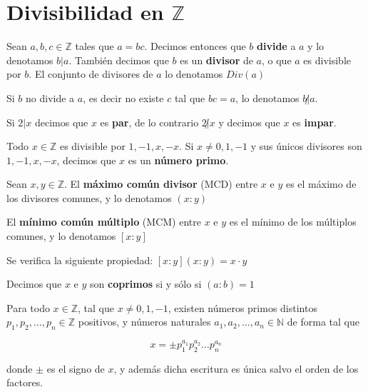 \section{Divisibilidad en $\mathbb{Z}$}

\begin{definition}[Divisibilidad] 
Sean $a,b,c \in \mathbb{Z}$ tales que $a = bc$.  Decimos entonces que $b$ \textbf{divide} a $a$ y lo denotamos $b | a$.  También decimos que $b$ es un \textbf{divisor} de $a$, o que $a$ es divisible por $b$.  El conjunto de divisores de $a$ lo denotamos $Div(a)$

Si $b$ no divide a $a$, es decir no existe $c$ tal que $bc = a$, lo denotamos $b \not| a$.

Si $2|x$ decimos que $x$ es \textbf{par}, de lo contrario $2 \not| x$ y decimos que $x$ es \textbf{impar}.
\end{definition}

\begin{definition} 
Todo $x \in \mathbb{Z}$ es divisible por $1,-1,x,-x$.  Si $x \neq 0,1,-1$ y sus únicos divisores son $1,-1,x,-x$, decimos que $x$ es un \textbf{número primo}.
\end{definition}

\begin{definition} 
Sean $x,y \in \mathbb{Z}$.  El \textbf{máximo común divisor} (MCD) entre $x$ e $y$ es el máximo de los divisores comunes, y lo denotamos $(x:y)$

El \textbf{mínimo común múltiplo} (MCM) entre $x$ e $y$ es el mínimo de los múltiplos comunes, y lo denotamos $[x:y]$

Se verifica la siguiente propiedad: $[x:y] (x:y) = x \cdot y$

Decimos que $x$ e $y$ son \textbf{coprimos} si y sólo si $(a:b) = 1$
\end{definition}

\begin{theorem} 
Para todo $x \in \mathbb{Z}$, tal que $x \neq 0, 1, -1$, existen números primos distintos $p_1, p_2, \ldots, p_n \in \mathbb{Z}$ positivos, y números naturales $a_1, a_2, \ldots, a_n \in \mathbb{N}$ de forma tal que

$$ x = \pm p_1^{a_1} p_2^{a_2} \ldots p_n^{a_n} $$

donde $\pm$ es el signo de $x$, y además dicha escritura es única salvo el orden de los factores.
\end{theorem}


